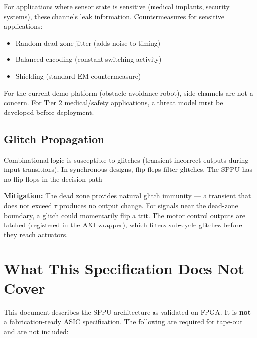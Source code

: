 \documentclass[11pt, a4paper]{article}
\begin{document}
For applications where sensor state is sensitive (medical
implants, security systems), these channels leak information.
Countermeasures for sensitive applications:
\begin{itemize}[nosep]
  \item Random dead-zone jitter (adds noise to timing)
  \item Balanced encoding (constant switching activity)
  \item Shielding (standard EM countermeasure)
\end{itemize}

For the current demo platform (obstacle avoidance robot), side
channels are not a concern. For Tier 2 medical/safety
applications, a threat model must be developed before deployment.

\subsection{Glitch Propagation}

Combinational logic is susceptible to glitches (transient
incorrect outputs during input transitions). In synchronous
designs, flip-flops filter glitches. The SPPU has no flip-flops
in the decision path.

\textbf{Mitigation:} The dead zone provides natural glitch
immunity — a transient that does not exceed $\tau$ produces no
output change. For signals near the dead-zone boundary, a
glitch could momentarily flip a trit. The motor control outputs
are latched (registered in the AXI wrapper), which filters
sub-cycle glitches before they reach actuators.

\section{What This Specification Does Not Cover}

This document describes the SPPU architecture as validated on
FPGA. It is \textbf{not} a fabrication-ready ASIC specification.
The following are required for tape-out and are not included:
\end{document}
